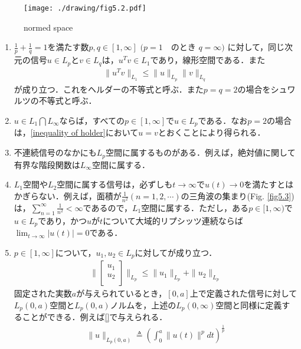 \documentclass[a4paper,11pt,uplatex]{jsarticle} %
\theoremstyle{definition}	%
\newcommand{\figref}[1]{Fig. \ref{#1}}
\begin{document}
\begin{figure}[t]
    \centering
    \texttt{[image: ./drawing/fig5.2.pdf]}
    \caption{normed space }
    \label{fig5.2}
\end{figure}

\begin{tcolorbox}[title=補足事項,
drop small lifted shadow=black]
\begin{enumerate}
    \item
    $ \frac{1}{p} + \frac{1}{q} = 1 $を満たす数$p, q \in [1, \infty]$  $( p = 1 $　のとき $ q = \infty ) $ に対して，同じ次元の信号$u \in L_p$と$v \in L_q $は，$u^T v \in L_1$であり，線形空間である．また
    \begin{align}
    \label{inequality of holder}
    \| u^T v \| _{L_1} \leq \| u \|_{L_p} \| v \|_{L_q}
    \end{align}
    が成り立つ．これをヘルダーの不等式と呼ぶ．また$p = q = 2$の場合をシュワルツの不等式と呼ぶ．
    
    \item  $u \in L_1 \bigcap L_\infty $ならば，すべての$ p \in [1, \infty]$で$u \in L_p $である．なお$ p = 2 $の場合は，\eqref{inequality of holder}において$u = v$とおくことにより得られる．
    \item 不連続信号のなかにも$L_p$空間に属するものがある．例えば，絶対値に関して有界な階段関数は$L_\infty$空間に属する．
    \item $L_1$空間や$L_2$空間に属する信号は，必ずしも$t \to \infty$で$u(t) \to 0$を満たすとはかぎらない．例えば，面積が$\frac{1}{n^2}(n = 1, 2, \cdots)$の三角波の集まり(\figref{fig5.3})は，$\sum_{n = 1}^\infty \frac{1}{n^2} < \infty $であるので，$L_1$空間に属する．ただし，ある$p \in [1, \infty)$で$u \in L_p $であり，かつ$u$が$t$について大域的リプシッツ連続ならば$\lim_{t \to \infty} | u(t) | = 0$である．
    \item $p \in [1, \infty]$について，$u_1, u_2 \in L_p $に対してが成り立つ．
            \begin{align}
            \label{eq5.8}
            \|
            \begin{bmatrix}
                u_1 \\
                u_2 \\
            \end{bmatrix}
            \|_{L_p} \leq \| u_1 \|_{L_p} + \| u_2 \|_{L_p}
            \end{align}
            固定された実数$a$が与えられているとき，$[0, a]$上で定義された信号に対して$L_p (0, a)$空間と$L_p(0,a)$ノルムを，上述の$L_p(0,\infty)$空間と同様に定義することができる．例えば\eqref{}で与えられる．
            \begin{align}
            \label{eq5.9}
            \| u \|_{L_p (0,a)} \triangleq ( \int_0^a \| u(t) \|^p dt )^{\frac{1}{p}}
            \end{align}
    \end{enumerate}
\end{tcolorbox}
\end{document}
